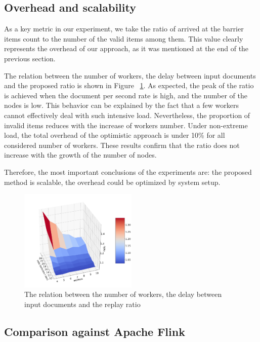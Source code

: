 \subsection{Overhead and scalability}

As a key metric in our experiment, we take the ratio of arrived at the barrier items count to the number of the valid items among them. This value clearly represents the overhead of our approach, as it was mentioned at the end of the previous section. 

The relation between the number of workers, the delay between input documents and the proposed ratio is shown in Figure ~\ref{experiment}. As expected, the peak of the ratio is achieved when the document per second rate is high, and the number of the nodes is low. This behavior can be explained by the fact that a few workers cannot effectively deal with such intensive load. Nevertheless, the proportion of invalid items reduces with the increase of workers number. Under non-extreme load, the total overhead of the optimistic approach is under 10\% for all considered number of workers. These results confirm that the ratio does not increase with the growth of the number of nodes.

Therefore, the most important conclusions of the experiments are: the proposed method is scalable, the overhead could be optimized by system setup.

\begin{figure}[htbp]
  \centering
  \includegraphics[width=0.5\textwidth]{pics/experiment}
  \caption{The relation between the number of workers, the delay between input documents and the replay ratio}
  \label {experiment}
\end{figure}

\subsection{Comparison against Apache Flink}

